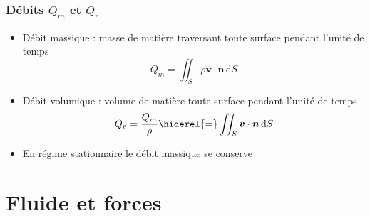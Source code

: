 \documentclass[%
	final, %
	 10pt, %
 	compress, %
hyperref={bookmarks=true}	
]{beamer}
\renewcommand{\v}[1]{\ensuremath{\bm{#1}}} %
\newcommand{\ddr}[1]{\, \mathrm{d} #1}
\begin{document}
\begin{frame}\frametitle{Débits $Q_{m}$ et $Q_{v}$}
\begin{itemize}
\item Débit massique : masse de matière traversant toute surface
  pendant l'unité de temps 
\begin{dmath*}
Q_{m} = \iint_{S} \rho \v{v} \cdot \v{n} \ddr S
\end{dmath*}
\item Débit volumique : volume de matière  toute surface
  pendant l'unité de temps 
\begin{dmath*}
Q_{v} = \dfrac{Q_{m}}{\rho} \hiderel{=} \iint_{S} \v{v} \cdot \v{n} \ddr S
\end{dmath*}
\item En régime stationnaire le débit massique se conserve
\end{itemize}
\end{frame}




\section{Fluide et forces}
\label{sec:fluide-et-forces}
\end{document}
